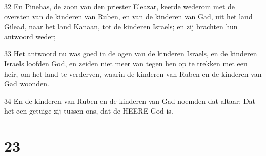 \par 32 En Pinehas, de zoon van den priester Eleazar, keerde wederom met de oversten van de kinderen van Ruben, en van de kinderen van Gad, uit het land Gilead, naar het land Kanaan, tot de kinderen Israels; en zij brachten hun antwoord weder;
\par 33 Het antwoord nu was goed in de ogen van de kinderen Israels, en de kinderen Israels loofden God, en zeiden niet meer van tegen hen op te trekken met een heir, om het land te verderven, waarin de kinderen van Ruben en de kinderen van Gad woonden.
\par 34 En de kinderen van Ruben en de kinderen van Gad noemden dat altaar: Dat het een getuige zij tussen ons, dat de HEERE God is.

\chapter{23}

